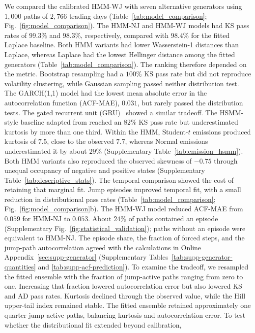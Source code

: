 We compared the calibrated HMM-WJ with seven alternative generators
using $1{,}000$ paths of $2{,}766$ trading days
(Table~\ref{tab:model_comparison}; Fig.~\ref{fig:model_comparison}).
The HMM-NJ and HMM-WJ models had KS pass rates of $99.3\%$ and
$98.3\%$, respectively, compared with $98.4\%$ for the fitted
Laplace baseline. Both HMM variants had lower Wasserstein-1 distances
than Laplace, whereas Laplace had the lowest Hellinger distance among
the fitted generators (Table~\ref{tab:model_comparison}). The
ranking therefore depended on the metric. Bootstrap resampling had a
$100\%$ KS pass rate but did not reproduce volatility clustering,
while Gaussian sampling passed neither distribution test.
The GARCH(1,1) model had the lowest mean absolute error in the
autocorrelation function (ACF-MAE), $0.031$, but rarely passed the
distribution tests. The gated recurrent unit (GRU)~\cite{choEtAl2014gru}
showed a similar tradeoff. The HSMM-style baseline adapted from \citet{bullaBulla2006} reached an $82\%$ KS pass rate but
underestimated kurtosis by more than one third. Within the HMM,
Student-$t$ emissions produced kurtosis of $7.5$, close to the
observed $7.7$, whereas Normal emissions underestimated it by about
$29\%$ (Supplementary Table~\ref{tab:emission_hsmm}). Both HMM variants also
reproduced the observed skewness of $-0.75$ through unequal occupancy
of negative and positive states (Supplementary Table~\ref{tab:descriptive_stats}).
The temporal comparison showed the cost of retaining that marginal fit.
Jump episodes improved temporal fit, with a small reduction in
distributional pass rates (Table~\ref{tab:model_comparison};
Fig.~\ref{fig:model_comparison}b). The HMM-WJ model reduced ACF-MAE from
$0.059$ for HMM-NJ to $0.053$. About $24\%$ of paths contained an
episode (Supplementary Fig.~\ref{fig:statistical_validation}); paths without an
episode were equivalent to HMM-NJ. The
episode share, the fraction of forced steps, and the jump-path
autocorrelation agreed with the calculations in Online
Appendix~\ref{sec:supp-generator}
(Supplementary Tables~\ref{tab:supp-generator-quantities} and
\ref{tab:supp-acf-prediction}). To examine the tradeoff, we
resampled the fitted ensemble with the fraction of jump-active paths
ranging from zero to one. Increasing that fraction lowered
autocorrelation error but also lowered KS and AD pass rates.
Kurtosis declined through the observed value, while the Hill
upper-tail index remained stable. The fitted ensemble retained approximately one quarter jump-active
paths, balancing kurtosis and autocorrelation error.
To test whether the distributional fit extended beyond calibration,
